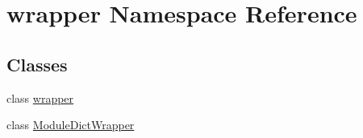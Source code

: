 \hypertarget{namespacewrapper}{
\section{wrapper Namespace Reference}
\label{namespacewrapper}
}
\subsection*{Classes}
\begin{DoxyCompactItemize}
\item 
class \hyperlink{classwrapper_1_1wrapper}{wrapper}
\item 
class \hyperlink{classwrapper_1_1ModuleDictWrapper}{ModuleDictWrapper}
\end{DoxyCompactItemize}
